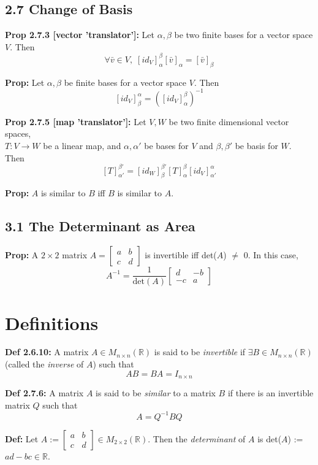 \pagebreak

\subsection*{2.7 Change of Basis}

\textbf{Prop 2.7.3 [vector 'translator']:} Let $\alpha, \beta$ be two finite bases for a vector space $V$. Then 
\[\forall \bar v \in V, \; [id_V]_\alpha^\beta [\bar v]_\alpha = [\bar v]_\beta\]

\noindent 
\textbf{Prop:} Let $\alpha, \beta$ be finite bases for a vector space $V$. Then 
\[[id_V]_\beta^\alpha = ([id_V]_\alpha^\beta)^{-1}\]

\noindent 
\textbf{Prop 2.7.5 [map 'translator']:} Let $V, W$ be two finite dimensional vector spaces, \\
$T: V \rightarrow W$ be a linear map, and $\alpha, \alpha'$ be bases for $V$ and $\beta, \beta'$ be basis for $W$. 
Then 
\[[T]_{\alpha'}^{\beta'} = [id_W]_\beta^{\beta'}[T]_\alpha^\beta[id_V]_{\alpha'}^\alpha\]

\noindent
\textbf{Prop:} $A$ is similar to $B$ iff $B$ is similar to $A$.

\subsection*{3.1 The Determinant as Area}

\textbf{Prop:} A $2 \times 2$ matrix $A = 
\begin{bmatrix}
    a & b \\ 
    c & d
\end{bmatrix}$
is invertible iff det($A$) $\ne$ $0$. In this case, 
\[A^{-1} = \frac{1}{\text{det}(A)}
\begin{bmatrix}
    d & -b \\ 
    -c & a
\end{bmatrix}
\] 

\pagebreak

\section*{Definitions}

\textbf{Def 2.6.10:} A matrix $A \in M_{n \times n}(\mathbb{R})$ is said to be \textit{invertible} if $\exists B \in M_{n \times n}(\mathbb{R})$ (called the \textit{inverse} of $A$) such that 
\[AB = BA = I_{n \times n}\]

\bigskip 

\noindent 
\textbf{Def 2.7.6:} A matrix $A$ is said to be \textit{similar} to a matrix $B$ if there is an invertible matrix $Q$ such that \[A = Q^{-1}BQ\]

\bigskip 

\noindent 
\textbf{Def:} Let $A:= 
\begin{bmatrix}
    a & b \\ 
    c & d
\end{bmatrix} 
\in M_{2 \times 2}(\mathbb{R})$. Then the \textit{determinant} of $A$ is det($A$) := $ad - bc \in \mathbb{R}$.